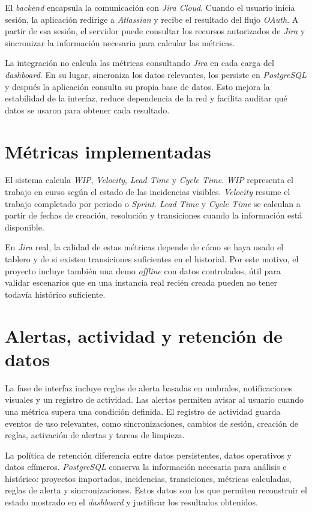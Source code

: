 El \textit{backend} encapsula la comunicación con \textit{Jira Cloud}. Cuando el usuario inicia sesión, la aplicación redirige a \textit{Atlassian} y recibe el resultado del flujo \textit{OAuth}. A partir de esa sesión, el servidor puede consultar los recursos autorizados de \textit{Jira} y sincronizar la información necesaria para calcular las métricas.

La integración no calcula las métricas consultando \textit{Jira} en cada carga del \textit{dashboard}. En su lugar, sincroniza los datos relevantes, los persiste en \textit{PostgreSQL} y después la aplicación consulta su propia base de datos. Esto mejora la estabilidad de la interfaz, reduce dependencia de la red y facilita auditar qué datos se usaron para obtener cada resultado.

\section{Métricas implementadas}

El sistema calcula \textit{WIP}, \textit{Velocity}, \textit{Lead Time} y \textit{Cycle Time}. \textit{WIP} representa el trabajo en curso según el estado de las incidencias visibles. \textit{Velocity} resume el trabajo completado por periodo o \textit{Sprint}. \textit{Lead Time} y \textit{Cycle Time} se calculan a partir de fechas de creación, resolución y transiciones cuando la información está disponible.

En \textit{Jira} real, la calidad de estas métricas depende de cómo se haya usado el tablero y de si existen transiciones suficientes en el historial. Por este motivo, el proyecto incluye también una demo \textit{offline} con datos controlados, útil para validar escenarios que en una instancia real recién creada pueden no tener todavía histórico suficiente.

\section{Alertas, actividad y retención de datos}

La fase de interfaz incluye reglas de alerta basadas en umbrales, notificaciones visuales y un registro de actividad. Las alertas permiten avisar al usuario cuando una métrica supera una condición definida. El registro de actividad guarda eventos de uso relevantes, como sincronizaciones, cambios de sesión, creación de reglas, activación de alertas y tareas de limpieza.

La política de retención diferencia entre datos persistentes, datos operativos y datos efímeros. \textit{PostgreSQL} conserva la información necesaria para análisis e histórico: proyectos importados, incidencias, transiciones, métricas calculadas, reglas de alerta y sincronizaciones. Estos datos son los que permiten reconstruir el estado mostrado en el \textit{dashboard} y justificar los resultados obtenidos.

